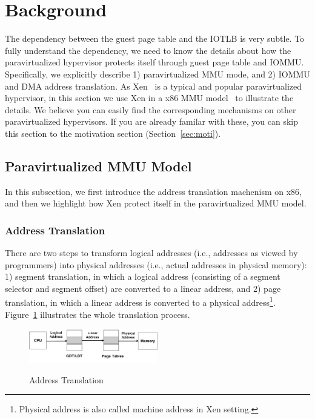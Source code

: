 \section{Background} \label{sec:background}
The dependency between the guest page table and the IOTLB is very subtle. 
To fully understand the dependency, we need to know the details about how the paravirtualized hypervisor protects itself through guest page table and IOMMU.
Specifically, we explicitly describe 1) paravirtualized MMU mode, and 2) IOMMU and DMA address translation.
As Xen~\cite{XEN-SOSP03} is a typical and popular paravirtualized hypervisor, in this section we use Xen in a x86 MMU model~\cite{x86-pv-model} to illustrate the details. We believe you can easily find the corresponding mechanisms on other paravirtualized hypervisors. 
If you are already familar with these, you can skip this section to the motivation section (Section~\ref{sec:moti}).  



\subsection{Paravirtualized MMU Model}\label{sec:pvmodel}
In this subsection, we first introduce the address translation machenism on x86, and then we highlight how Xen protect itself in the paravirtualized MMU model.

\subsubsection{Address Translation}\label{sec:addr-trans}
There are two steps to transform logical addresses (i.e., addresses as viewed by programmers) into physical addresses (i.e., actual addresses in physical memory): 
1) segment translation, in which a logical address (consisting of a segment selector and segment offset) are converted to a linear address, 
and 2) page translation, in which a linear address is converted to a physical address\footnote{Physical address is also called machine address in Xen setting.}.
Figure~\ref{fig:address-translation} illustrates the whole translation process.
\begin{figure}[ht]
\centering
\includegraphics[width=0.5\textwidth]{image/background/address-translation.png} \\
\caption{Address Translation}
\label{fig:address-translation}
\end{figure}


